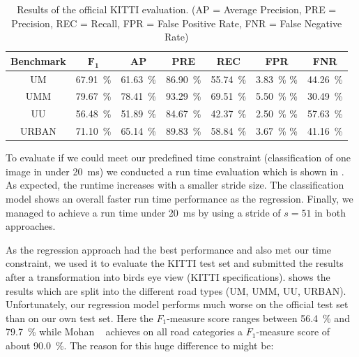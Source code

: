 \begin{table}[]
    \begin{center}
    \begin{tabular}{c|cccccc}
        \toprule
        {\bf Benchmark} & {\bf $\mathbf{F_1}$} & {\bf AP} & {\bf PRE} & {\bf REC} & {\bf FPR} & {\bf FNR}\\
        \midrule
        UM    & \SI{67.91}{\percent} & \SI{61.63}{\percent} & \SI{86.90}{\percent} & \SI{55.74}{\percent} & \SI{3.83}{\percent} \% & \SI{44.26}{\percent}\\
        UMM   & \SI{79.67}{\percent} & \SI{78.41}{\percent} & \SI{93.29}{\percent} & \SI{69.51}{\percent} & \SI{5.50}{\percent} \% & \SI{30.49}{\percent}\\
        UU    & \SI{56.48}{\percent} & \SI{51.89}{\percent} & \SI{84.67}{\percent} & \SI{42.37}{\percent} & \SI{2.50}{\percent} \% & \SI{57.63}{\percent}\\
        URBAN & \SI{71.10}{\percent} & \SI{65.14}{\percent} & \SI{89.83}{\percent} & \SI{58.84}{\percent} & \SI{3.67}{\percent} \% & \SI{41.16}{\percent}\\
        \bottomrule
        \end{tabular}
    \end{center}
    \caption{Results of the official KITTI evaluation. (AP = Average Precision, PRE = Precision, REC = Recall, FPR = False Positive Rate, FNR = False Negative Rate)}
    \label{tab:kitti}
\end{table}



To evaluate if we could meet our predefined time constraint (classification of
one image in under \SI{20}{\milli\second}) we conducted a run time evaluation
which is shown in . As expected, the runtime increases with a
smaller stride size. The classification model shows an overall faster run time
performance as the regression. Finally, we managed to achieve a run time under
\SI{20}{\milli\second} by using a stride of $s=51$ in both approaches.





As the regression approach had the best performance and also met our time
constraint, we used it to evaluate the KITTI test set and submitted the results
after a transformation into birds eye view (KITTI
specifications). shows the results which are split into the
different road types (UM, UMM, UU, URBAN).
Unfortunately, our regression model performs much worse on the official test
set than on our own test set. Here the $F_1$-measure score ranges between
\SI{56.4}{\percent} and \SI{79.7}{\percent} while Mohan ~\cite{Tarel2009}
achieves on all road categories a $F_1$-measure score of about
\SI{90.0}{\percent}. The reason for this huge difference to might be: \\

